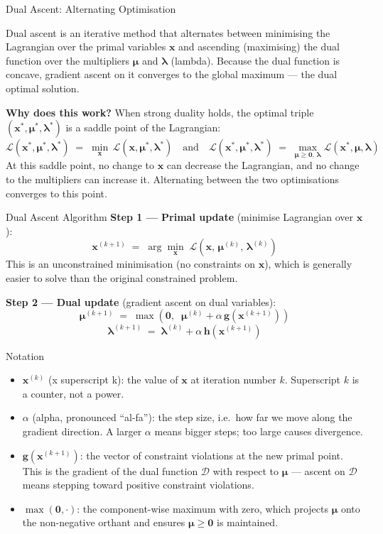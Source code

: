 \documentclass[aspectratio=169,10pt]{beamer}
\newcommand{\bx}{\mathbf{x}}
\newcommand{\bg}{\mathbf{g}}
\newcommand{\bh}{\mathbf{h}}
\newcommand{\bmu}{\boldsymbol{\mu}}
\newcommand{\blam}{\boldsymbol{\lambda}}
\newcommand{\calL}{\mathcal{L}}
\newcommand{\calD}{\mathcal{D}}
\begin{document}
\begin{frame}[allowframebreaks]{Dual Ascent: Alternating Optimisation}

  Dual ascent is an iterative method that alternates between minimising
  the Lagrangian over the primal variables $\bx$ and ascending (maximising)
  the dual function over the multipliers $\bmu$ and $\blam$ (lambda).
  Because the dual function is concave, gradient ascent on it converges to
  the global maximum --- the dual optimal solution.

  \medskip
  \textbf{Why does this work?}  When strong duality holds, the optimal
  triple $(\bx^*, \bmu^*, \blam^*)$ is a saddle point of the Lagrangian:
  \[
    \calL(\bx^*, \bmu^*, \blam^*) \;=\; \min_{\bx}\, \calL(\bx, \bmu^*, \blam^*)
    \quad \text{and} \quad
    \calL(\bx^*, \bmu^*, \blam^*) \;=\; \max_{\bmu \ge \mathbf{0},\, \blam}
    \calL(\bx^*, \bmu, \blam)
  \]
  At this saddle point, no change to $\bx$ can decrease the Lagrangian, and
  no change to the multipliers can increase it.  Alternating between the two
  optimisations converges to this point.

  \begin{block}{Dual Ascent Algorithm}
    \textbf{Step 1 --- Primal update} (minimise Lagrangian over $\bx$):
    \[
      \bx^{(k+1)} \;=\; \arg\min_{\bx}\; \calL\!\left(\bx,\, \bmu^{(k)},\, \blam^{(k)}\right)
    \]
    This is an unconstrained minimisation (no constraints on $\bx$), which
    is generally easier to solve than the original constrained problem.

    \medskip
    \textbf{Step 2 --- Dual update} (gradient ascent on dual variables):
    \[
      \bmu^{(k+1)} \;=\; \max\!\left(\mathbf{0},\;\; \bmu^{(k)} + \alpha\, \bg\!\left(\bx^{(k+1)}\right)\right)
    \]
    \[
      \blam^{(k+1)} \;=\; \blam^{(k)} + \alpha\, \bh\!\left(\bx^{(k+1)}\right)
    \]
  \end{block}

  \begin{block}{Notation}
    \begin{itemize}
      \item $\bx^{(k)}$ (x superscript k): the value of $\bx$ at iteration
            number $k$.  Superscript $k$ is a counter, not a power.
      \item $\alpha$ (alpha, pronounced ``al-fa''): the step size, i.e.\
            how far we move along the gradient direction.  A larger $\alpha$
            means bigger steps; too large causes divergence.
      \item $\bg(\bx^{(k+1)})$: the vector of constraint violations at the
            new primal point.  This is the gradient of the dual function
            $\calD$ with respect to $\bmu$ --- ascent on $\calD$ means
            stepping toward positive constraint violations.
      \item $\max(\mathbf{0}, \cdot)$: the component-wise maximum with
            zero, which projects $\bmu$ onto the non-negative orthant and
            ensures $\bmu \ge \mathbf{0}$ is maintained.
    \end{itemize}
  \end{block}


\end{frame}
\end{document}
